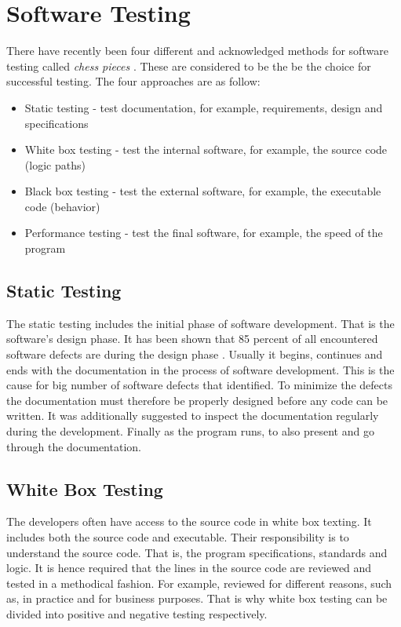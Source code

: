 \documentclass[a4paper,11pt]{kth-mag}
\begin{document}
\section{Software Testing}
There have recently been four different and acknowledged methods for software testing called \emph{chess pieces} \cite{bk:chesspieces}.
These are considered to be the be the choice for successful testing.
The four approaches are as follow:

\begin{itemize}
    \item Static testing - test documentation, for example, requirements, design and specifications
    \item White box testing - test the internal software, for example, the source code (logic paths)
    \item Black box testing - test the external software, for example, the executable code (behavior)
    \item Performance testing - test the final software, for example, the speed of the program
\end{itemize}

\subsection{Static Testing}
The static testing includes the initial phase of software development.
That is the software's design phase.
It has been shown that 85 percent of all encountered software defects are during the design phase \cite{bk:chesspieces}.
Usually it begins, continues and ends with the documentation in the process of software development.
This is the cause for big number of software defects that \cite{bk:chesspieces} identified.
To minimize the defects the documentation must therefore be properly designed before any code can be written.
It was additionally suggested to inspect the documentation regularly during the development.
Finally as the program runs, to also present and go through the documentation.

\subsection{White Box Testing}
The developers often have access to the source code in white box texting.
It includes both the source code and executable.
Their responsibility is to understand the source code.
That is, the program specifications, standards and logic.
It is hence required that the lines in the source code are reviewed and tested in a methodical fashion.
For example, reviewed for different reasons, such as, in practice and for business purposes.
That is why white box testing can be divided into positive and negative testing respectively.
\end{document}
